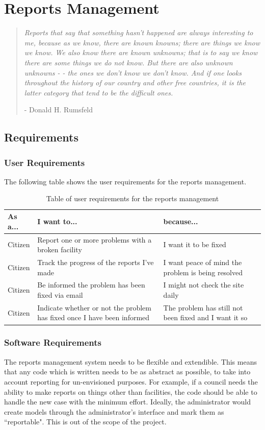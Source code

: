 \chapter{Reports Management}
\begin{quote}
\em{Reports that say that something hasn't happened are always interesting to me, because as we know, there are known knowns; there are things we know we know. We also know there are known unknowns; that is to say we know there are some things we do not know. But there are also unknown unknowns - - the ones we don't know we don't know. And if one looks throughout the history of our country and other free countries, it is the latter category that tend to be the difficult ones.}
\begin{flushright}
- Donald H. Rumsfeld ~\cite{rumsfeld}
\end{flushright}
\end{quote}
\section{Requirements}
\subsection{User Requirements}
The following table shows the user requirements for the reports management.
\begin{table}[h]
\centering
\begin{tabular}{p{2cm}p{4.2cm}p{4.2cm}}
\textbf{As a...} & \textbf{I want to...} & \textbf{because...} \\
\hline
Citizen & Report one or more problems with a broken facility & I want it to be fixed \\
Citizen & Track the progress of the reports I've made & I want peace of mind the problem is being resolved \\
Citizen & Be informed the problem has been fixed via email & I might not check the site daily \\
Citizen & Indicate whether or not the problem has fixed once I have been informed & The problem has still not been fixed and I want it so \\
\end{tabular}
\caption{Table of user requirements for the reports management}
\label{tab:reportsrequirements}
\end{table}

\subsection{Software Requirements}
The reports management system needs to be flexible and extendible. This means that any code which is written needs to be as abstract as possible, to take into account reporting for un-envisioned purposes. For example, if a council needs the ability to make reports on things other than facilities, the code should be able to handle the new case with the minimum effort. Ideally, the administrator would create models through the administrator's interface and mark them as ``reportable". This is out of the scope of the project.


